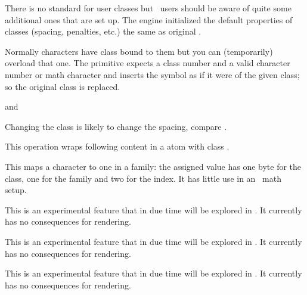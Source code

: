 There is no standard for user classes but \CONTEXT\ users should be aware of
quite some additional ones that are set up. The engine initialized the default
properties of classes (spacing, penalties, etc.) the same as original \TEX.

Normally characters have class bound to them but you can (temporarily) overload
that one. The  primitive expects a class number and a valid
character number or math character and inserts the symbol as if it were of the
given class; so the original class is replaced.

\startbuffer
{} and 
\stopbuffer

\typebuffer

Changing the class is likely to change the spacing, compare \inlinebuffer.

\stopnewprimitive

\startoldprimitive[title={\prm {mathclose}}]

This operation wraps following content in a atom with class .

\stopoldprimitive

\startoldprimitive[title={\prm {mathcode}}][obsolete=yes]

This maps a character to one in a family: the assigned value has one byte for the
class, one for the family and two for the index. It has little use in an
\OPENTYPE\ math setup.

\stopoldprimitive

\startnewprimitive[title={\prm {mathdictgroup}}]

This is an experimental feature that in due time will be explored in \CONTEXT. It
currently has no consequences for rendering.

\stopnewprimitive

\startnewprimitive[title={\prm {mathdictionary}}]

This is an experimental feature that in due time will be explored in \CONTEXT. It
currently has no consequences for rendering.

\stopnewprimitive

\startnewprimitive[title={\prm {mathdictproperties}}]

This is an experimental feature that in due time will be explored in \CONTEXT. It
currently has no consequences for rendering.

\stopnewprimitive

\startnewprimitive[title={\prm {mathdirection}}]

